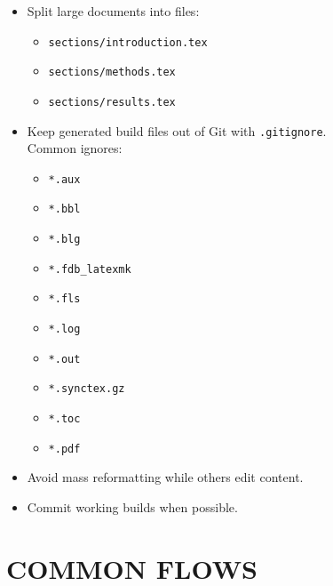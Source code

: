 \documentclass[a4paper,11pt]{article}
\begin{document}
\begin{itemize}
  \renewcommand{\labelitemi}{$\rightarrow$}

  \item Split large documents into files:
    \begin{itemize}
      \renewcommand{\labelitemii}{$\triangleright$}
      \item \texttt{sections/introduction.tex}
      \item \texttt{sections/methods.tex}
      \item \texttt{sections/results.tex}
    \end{itemize}

  \item Keep generated build files out of Git with \texttt{.gitignore}. \\
        Common ignores:
    \begin{itemize}
      \renewcommand{\labelitemii}{$\triangleright$}
      \item \texttt{*.aux}
      \item \texttt{*.bbl}
      \item \texttt{*.blg}
      \item \texttt{*.fdb\_latexmk}
      \item \texttt{*.fls}
      \item \texttt{*.log}
      \item \texttt{*.out}
      \item \texttt{*.synctex.gz}
      \item \texttt{*.toc}
      \item \texttt{*.pdf}
    \end{itemize}

  \item Avoid mass reformatting while others edit content.
  \item Commit working builds when possible.

\end{itemize}

\section*{COMMON FLOWS}
\end{document}
